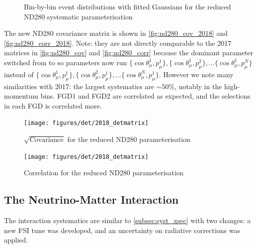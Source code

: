 \begin{figure}[h]
\begin{subfigure}[t]{0.32\textwidth}
	\end{subfigure}
	\caption{Bin-by-bin event distributions with fitted Gaussians for the reduced ND280 systematic parameterisation}
	\label{fig:det_binbybin}
\end{figure}

The new ND280 covariance matrix is shown in \autoref{fig:nd280_cov_2018} and \autoref{fig:nd280_corr_2018}. Note: they are not directly comparable to the 2017 matrices in \autoref{fig:nd280_cov} and \autoref{fig:nd280_corr} because the dominant parameter switched from \pmu to \cosmu so parameters now run $\{\cos\theta_\mu^1,p_\mu^1\}, \{\cos\theta_\mu^1,p_\mu^2\},...\{\cos\theta_\mu^1,p_\mu^N\}$ instead of $\{\cos\theta_\mu^1,p_\mu^1\}, \{\cos\theta_\mu^2,p_\mu^1\},...\{\cos\theta_\mu^N,p_\mu^1\}$. However we note many similarities with 2017: the largest systematics are $\sim50\%$, notably in the high-momentum bins. FGD1 and FGD2 are correlated as expected, and the selections in each FGD is correlated more.
\begin{figure}[h]
	\texttt{[image: figures/det/2018\_detmatrix]}
	\caption{$\sqrt{\text{Covariance}}$ for the reduced ND280 parameterisation}
	\label{fig:nd280_cov_2018}
\end{figure}

\begin{figure}[h]
	\texttt{[image: figures/det/2018\_detmatrix]}
	\caption{Correlation for the reduced ND280 parameterisation}
	\label{fig:nd280_corr_2018}
\end{figure}

\subsection{The Neutrino-Matter Interaction}
The interaction systematics are similar to \autoref{subsec:syst_xsec} with two changes: a new FSI tune was developed, and an uncertainty on radiative corrections was applied.

